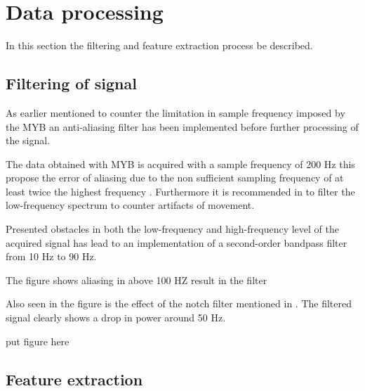 

\section{Data processing}

In this section the filtering and feature extraction process be described.

\subsection{Filtering of signal} \label{sec:prePros} 

As earlier mentioned to counter the limitation in sample frequency imposed by the MYB an anti-aliasing filter has been implemented before further processing of the signal.  


The data obtained with MYB is acquired with a sample frequency of 200 Hz this propose the error of aliasing due to the non sufficient sampling frequency of at least twice the highest frequency \cite{Pozzo2004}. Furthermore it is recommended in \cite{DeLuca2010} to filter the low-frequency spectrum to counter artifacts of movement.



 Presented obstacles in both the low-frequency and high-frequency level of the acquired signal has lead to an implementation of a second-order bandpass filter from 10 Hz to 90 Hz. 

The figure shows aliasing in above 100 HZ 
result in the filter 

Also seen in the figure is the effect of the notch filter mentioned in . The filtered signal clearly shows a drop in power around 50 Hz. 

put figure here 



\subsection{Feature extraction}
































